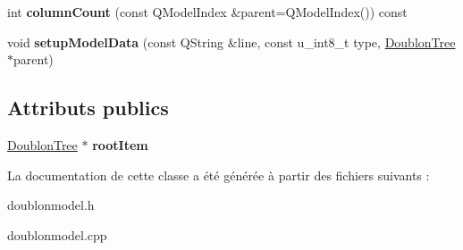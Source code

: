 \begin{DoxyCompactItemize}
\item 
\hypertarget{class_doublon_model_a47458991a1f0e7f4ae8bf79af4ff0c16}{int {\bfseries column\-Count} (const Q\-Model\-Index \&parent=Q\-Model\-Index()) const }\label{class_doublon_model_a47458991a1f0e7f4ae8bf79af4ff0c16}

\item 
\hypertarget{class_doublon_model_a3188f8b049e9da84ca293b8e62990ba3}{void {\bfseries setup\-Model\-Data} (const Q\-String \&line, const u\-\_\-int8\-\_\-t type, \hyperlink{class_doublon_tree}{Doublon\-Tree} $\ast$parent)}\label{class_doublon_model_a3188f8b049e9da84ca293b8e62990ba3}

\end{DoxyCompactItemize}
\subsection*{Attributs publics}
\begin{DoxyCompactItemize}
\item 
\hypertarget{class_doublon_model_ad622e10652206f0f725b2aec69d11a18}{\hyperlink{class_doublon_tree}{Doublon\-Tree} $\ast$ {\bfseries root\-Item}}\label{class_doublon_model_ad622e10652206f0f725b2aec69d11a18}

\end{DoxyCompactItemize}


La documentation de cette classe a été générée à partir des fichiers suivants \-:\begin{DoxyCompactItemize}
\item 
doublonmodel.\-h\item 
doublonmodel.\-cpp\end{DoxyCompactItemize}
